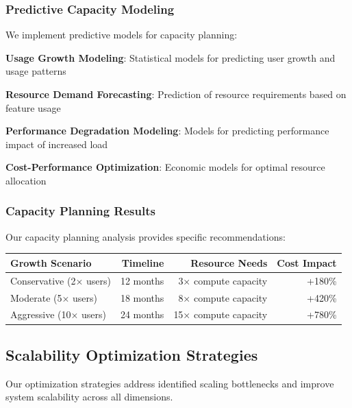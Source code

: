 \subsubsection*{Predictive Capacity Modeling}

We implement predictive models for capacity planning:

\begin{compactlist}
    \item \textbf{Usage Growth Modeling}: Statistical models for predicting user growth and usage patterns
    \item \textbf{Resource Demand Forecasting}: Prediction of resource requirements based on feature usage
    \item \textbf{Performance Degradation Modeling}: Models for predicting performance impact of increased load
    \item \textbf{Cost-Performance Optimization}: Economic models for optimal resource allocation
\end{compactlist}

\subsubsection*{Capacity Planning Results}

Our capacity planning analysis provides specific recommendations:

\begin{center}
\begin{tabular}{@{}lrrr@{}}
\toprule
\textbf{Growth Scenario} & \textbf{Timeline} & \textbf{Resource Needs} & \textbf{Cost Impact} \\
\midrule
Conservative (2× users) & 12 months & 3× compute capacity & +180\% \\
Moderate (5× users) & 18 months & 8× compute capacity & +420\% \\
Aggressive (10× users) & 24 months & 15× compute capacity & +780\% \\
\bottomrule
\end{tabular}
\end{center}

\subsection*{Scalability Optimization Strategies}

Our optimization strategies address identified scaling bottlenecks and improve system scalability across all dimensions.


